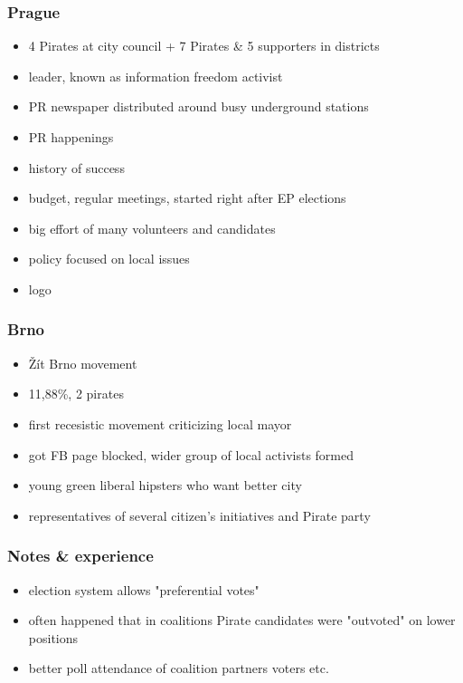 \begin{frame}
	\frametitle{Prague}
	\begin{itemize}
		\item 4 Pirates at city council + 7 Pirates \& 5 supporters in districts
		\item leader, known as information freedom activist
		\item PR newspaper distributed around busy underground stations
		\item PR happenings
		\item history of success
		\item budget, regular meetings, started right after EP elections
		\item big effort of many volunteers and candidates
		\item policy focused on local issues
		\item logo %
	\end{itemize}
\end{frame}
\begin{frame}
	\frametitle{Brno}
	\begin{itemize}
		\item \v{Z}\'it Brno movement
		\item 11,88\%, 2 pirates
		\item first recesistic movement criticizing local mayor
		\item got FB page blocked, wider group of local activists formed
		\item young green liberal hipsters who want better city
		\item representatives of several citizen's initiatives and Pirate party
	\end{itemize}
\end{frame}
\begin{frame}
	\frametitle{Notes \& experience}
	\begin{itemize}
		\item election system allows "preferential votes"
		\item often happened that in coalitions Pirate candidates were "outvoted" on lower positions
		\item better poll attendance of coalition partners voters etc.
	\end{itemize}
\end{frame}

